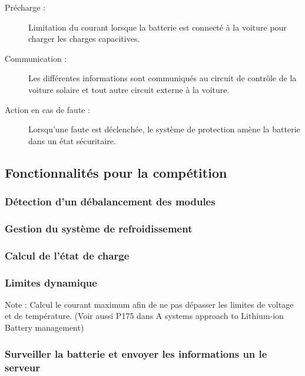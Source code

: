 \begin{description}
			\item [Précharge :]
			Limitation du courant lorsque la batterie est connecté à la voiture pour charger les charges capacitives.
			
			\item [Communication :] 
			Les différentes informations sont communiqués au circuit de contrôle de la voiture solaire et tout autre circuit externe à la voiture.	
			
			\item [Action en cas de faute :]
			Lorsqu'une faute est déclenchée, le système de protection amène la batterie dans un état sécuritaire. 
			
		\end{description} 
	
	\subsection{Fonctionnalités pour la compétition}
		\subsubsection{Détection d'un débalancement des modules}	
	
		\subsubsection{Gestion du système de refroidissement}
		
		\subsubsection{Calcul de l'état de charge}
		
		\subsubsection{Limites dynamique}
		Note : Calcul le courant maximum afin de ne pas dépasser les limites de voltage et de température. (Voir aussi P175 dans A systems approach to Lithium-ion Battery management)
		
		\subsubsection{Surveiller la batterie et envoyer les informations un le serveur}
		
		
